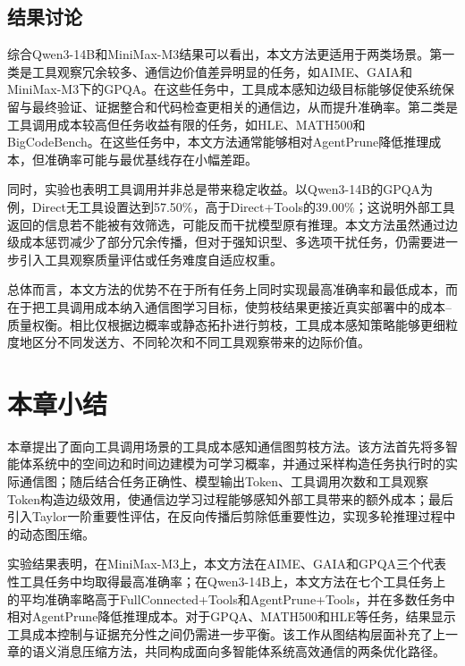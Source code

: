 \subsection{结果讨论}

综合Qwen3-14B和MiniMax-M3结果可以看出，本文方法更适用于两类场景。第一类是工具观察冗余较多、通信边价值差异明显的任务，如AIME、GAIA和MiniMax-M3下的GPQA。在这些任务中，工具成本感知边级目标能够促使系统保留与最终验证、证据整合和代码检查更相关的通信边，从而提升准确率。第二类是工具调用成本较高但任务收益有限的任务，如HLE、MATH500和BigCodeBench。在这些任务中，本文方法通常能够相对AgentPrune降低推理成本，但准确率可能与最优基线存在小幅差距。

同时，实验也表明工具调用并非总是带来稳定收益。以Qwen3-14B的GPQA为例，Direct无工具设置达到57.50\%，高于Direct+Tools的39.00\%；这说明外部工具返回的信息若不能被有效筛选，可能反而干扰模型原有推理。本文方法虽然通过边级成本惩罚减少了部分冗余传播，但对于强知识型、多选项干扰任务，仍需要进一步引入工具观察质量评估或任务难度自适应权重。

总体而言，本文方法的优势不在于所有任务上同时实现最高准确率和最低成本，而在于把工具调用成本纳入通信图学习目标，使剪枝结果更接近真实部署中的成本--质量权衡。相比仅根据边概率或静态拓扑进行剪枝，工具成本感知策略能够更细粒度地区分不同发送方、不同轮次和不同工具观察带来的边际价值。

\section{本章小结}

本章提出了面向工具调用场景的工具成本感知通信图剪枝方法。该方法首先将多智能体系统中的空间边和时间边建模为可学习概率，并通过采样构造任务执行时的实际通信图；随后结合任务正确性、模型输出Token、工具调用次数和工具观察Token构造边级效用，使通信边学习过程能够感知外部工具带来的额外成本；最后引入Taylor一阶重要性评估，在反向传播后剪除低重要性边，实现多轮推理过程中的动态图压缩。

实验结果表明，在MiniMax-M3上，本文方法在AIME、GAIA和GPQA三个代表性工具任务中均取得最高准确率；在Qwen3-14B上，本文方法在七个工具任务上的平均准确率略高于FullConnected+Tools和AgentPrune+Tools，并在多数任务中相对AgentPrune降低推理成本。对于GPQA、MATH500和HLE等任务，结果显示工具成本控制与证据充分性之间仍需进一步平衡。该工作从图结构层面补充了上一章的语义消息压缩方法，共同构成面向多智能体系统高效通信的两条优化路径。
